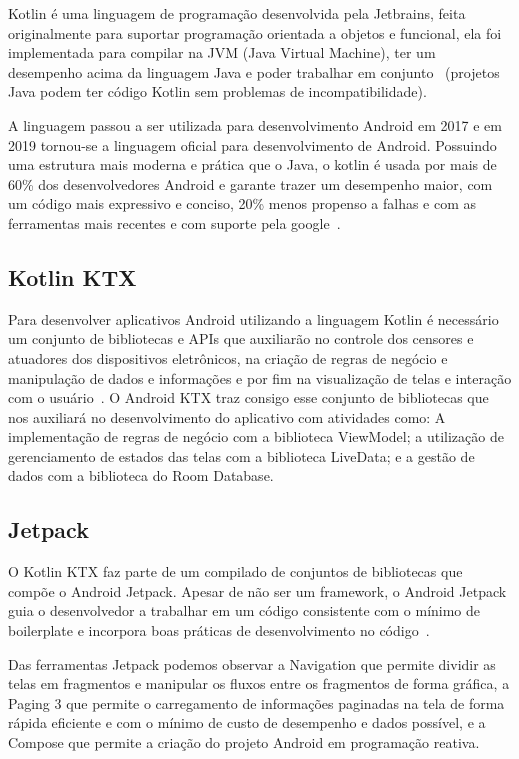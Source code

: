 Kotlin é uma linguagem de programação desenvolvida pela Jetbrains, feita originalmente para suportar programação orientada a objetos e funcional, ela foi implementada para compilar na JVM (Java Virtual Machine), ter um desempenho acima da linguagem Java e poder trabalhar em conjunto~\cite{kotlin} (projetos Java podem ter código Kotlin sem problemas de incompatibilidade).

A linguagem passou a ser utilizada para desenvolvimento Android em 2017 e em 2019 tornou-se a linguagem oficial para desenvolvimento de Android.
Possuindo uma estrutura mais moderna e prática que o Java, o kotlin é usada por mais de 60\% dos desenvolvedores Android e garante trazer um desempenho maior, com um código mais expressivo e conciso, 20\% menos propenso a falhas e com as ferramentas mais recentes e com suporte pela google~\cite{android}.

\subsection{Kotlin KTX}\label{subsec:kotlin-ktx}

Para desenvolver aplicativos Android utilizando a linguagem Kotlin é necessário um conjunto de bibliotecas e APIs que auxiliarão no controle dos censores e atuadores dos dispositivos eletrônicos, na criação de regras de negócio e manipulação de dados e informações e por fim na visualização de telas e interação com o usuário~\cite{ktx}.
O Android KTX traz consigo esse conjunto de bibliotecas que nos auxiliará no desenvolvimento do aplicativo com atividades como: A implementação de regras de negócio com a biblioteca ViewModel; a utilização de gerenciamento de estados das telas com a biblioteca LiveData; e a gestão de dados com a biblioteca do Room Database.

\subsection{Jetpack}\label{subsec:jetpack}

O Kotlin KTX faz parte de um compilado de conjuntos de bibliotecas que compõe o Android Jetpack.
Apesar de não ser um framework, o Android Jetpack guia o desenvolvedor a trabalhar em um código consistente com o mínimo de boilerplate e incorpora boas práticas de desenvolvimento no código~\cite{jetpack}.

Das ferramentas Jetpack podemos observar a Navigation que permite dividir as telas em fragmentos e manipular os fluxos entre os fragmentos de forma gráfica, a Paging 3 que permite o carregamento de informações paginadas na tela de forma rápida eficiente e com o mínimo de custo de desempenho e dados possível, e a Compose que permite a criação do projeto Android em programação reativa.